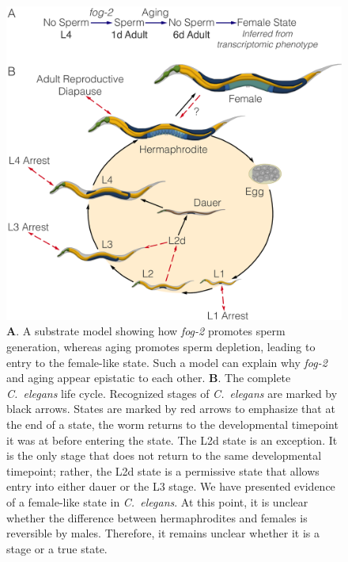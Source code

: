 \documentclass[9pt,twocolumn,twoside]{gsag3jnl}
\newcommand{\cel}{\emph{C.~elegans}}
\newcommand{\gene}[1]{\emph{\mbox{#1}}}
\begin{document}
\begin{figure}
  \renewcommand{\familydefault}{\sfdefault}\normalfont{}
  \centering
  \includegraphics[width=\linewidth]{../../output/figs/final_figs/c_elegans_life_cycle.pdf}
  \caption{
    \textbf{A}. A substrate model showing how \gene{fog-2} promotes sperm
    generation, whereas aging promotes sperm depletion, leading to entry to the
    female-like state. Such a model can explain why \gene{fog-2} and aging appear
    epistatic to each other.
    \textbf{B}. The complete \cel{} life cycle.
    Recognized stages of \cel{} are marked by black arrows. States are marked by
    red arrows to emphasize that at the end of a state, the worm returns to the
    developmental timepoint it was at before entering the state. The L2d state
    is an exception. It is the only stage that does not return to the same
    developmental timepoint; rather, the L2d state is a permissive state that
    allows entry into either dauer or the L3 stage. We have presented evidence
    of a female-like state in \cel{}. At this point, it is unclear whether the
    difference between hermaphrodites and females is reversible by males.
    Therefore, it remains unclear whether it is a stage or a true state.
  }%
\label{fig:lifecycle}
\end{figure}
\end{document}

